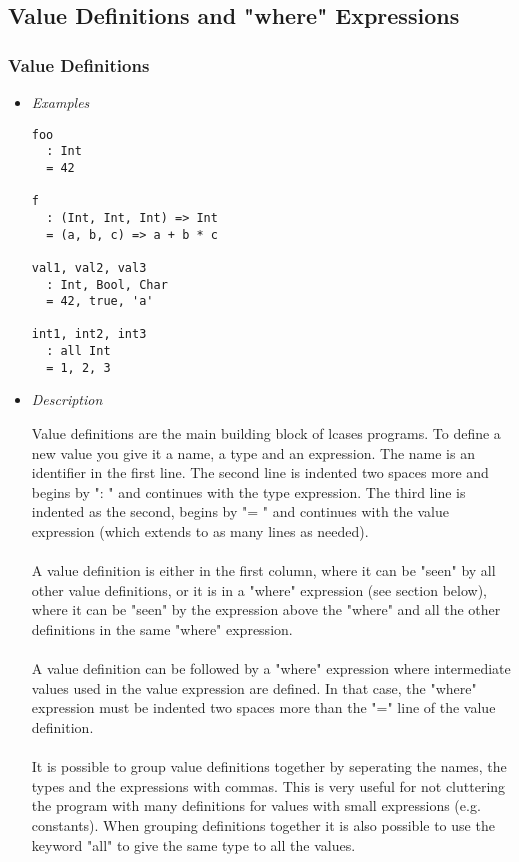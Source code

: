 \documentclass{article}
\begin{document}
\subsection{Value Definitions and "where" Expressions}
\label{subsec:valdefswhere}

\subsubsection{Value Definitions}
\label{subsubsec:valdefs}

\begin{itemize}

\item \textit{Examples}

\begin{verbatim}
foo
  : Int
  = 42

f
  : (Int, Int, Int) => Int
  = (a, b, c) => a + b * c

val1, val2, val3
  : Int, Bool, Char
  = 42, true, 'a'

int1, int2, int3
  : all Int
  = 1, 2, 3
\end{verbatim}

\item \textit{Description}

Value definitions are the main building block of lcases programs. To define a
new value you give it a name, a type and an expression. The name is an
identifier in the first line. The second line is indented two spaces more and
begins by ": " and continues with the type expression. The third line is
indented as the second, begins by "= " and continues with the value
expression (which extends to as many lines as needed).
\\\\
A value definition is either in the first column, where it can be "seen" by all
other value definitions, or it is in a "where" expression (see section below),
where it can be "seen" by the expression above the "where" and all the other
definitions in the same "where" expression.
\\\\
A value definition can be followed by a "where" expression where intermediate
values used in the value expression are defined. In that case, the "where"
expression must be indented two spaces more than the "=" line of the value
definition.
\\\\
It is possible to group value definitions together by seperating the names, the
types and the expressions with commas. This is very useful for not cluttering
the program with many definitions for values with small expressions (e.g.
constants).  When grouping definitions together it is also possible to use the
keyword "all" to give the same type to all the values.


\end{itemize}
\end{document}
